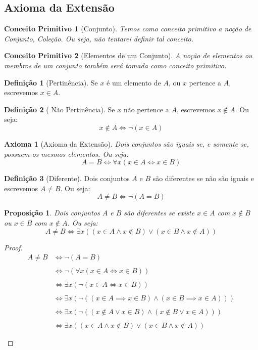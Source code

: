 \documentclass{article}
\theoremstyle{plain}
\newtheorem{axioma}{Axioma}
\newtheorem{conceitoPrimitivo}{Conceito Primitivo}
\newtheorem{prop}{Proposição}[section]
\theoremstyle{definition}
\newtheorem{definicao}{Definição}[section]
\theoremstyle{remark}
\begin{document}
\subsection{Axioma da Extensão}
\begin{conceitoPrimitivo}[Conjunto]
	Temos como conceito primitivo a noção de Conjunto, Coleção. Ou seja, não tentarei definir tal conceito.
\end{conceitoPrimitivo}
\begin{conceitoPrimitivo}[Elementos de um Conjunto]
	A noção de elementos ou membros de um conjunto também será tomada como conceito primitivo.
\end{conceitoPrimitivo}
\begin{definicao}[Pertinência]
	Se $x$ é um elemento de $A$, ou $x$ pertence a $A$, escrevemos $x\in A$.
\end{definicao}
\begin{definicao}[ Não Pertinência]
	Se $x$ não pertence a $A$, escrevemos $x \not \in A$. Ou seja:
	$$x \not \in A \iff \neg (x\in A)$$
\end{definicao}
\begin{axioma}[Axioma da Extensão]
	Dois conjuntos são iguais se, e somente se, possuem os mesmos elementos. Ou seja: 
	$$ A = B \iff \forall x ( x\in A \iff x \in B) $$
\end{axioma}
\begin{definicao}[Diferente]
	Dois conjuntos $A$ e $B$ são diferentes se não são iguais e escrevemos $A\neq B$. Ou seja:
	$$A\neq B \iff \neg (A = B)$$
\end{definicao}
\begin{prop}
	Dois conjuntos $A$ e $B$  são diferentes se existe $x\in A$ com $x\not \in B $ ou $x\in B$ com $x\not \in A$. Ou seja:
	$$A \neq B \iff \exists x ( ( x\in A \land x\not \in B) \lor (x\in B  \land x\not \in A))$$
\end{prop}
\begin{proof}
	\begin{align*}
		A\neq B &\iff \neg (A = B) \\~\\
		&\iff \neg (\forall x ( x\in A \iff x \in B)) \\~\\
		&\iff \exists x ( \neg ( x\in A \iff x \in B)) \\~\\
		&\iff \exists x ( \neg (( x\in A \implies x \in B) \land (x\in B \implies x\in A))) \\~\\
		&\iff \exists x ( \neg ((  x\not\in A \lor x\in B) \land ( x\not\in B \lor x\in A))) \\~\\
		&\iff \exists x ( (  x\in A \land x\not\in B) \lor ( x\in B \land x\not \in A)) \\~\\
	\end{align*}
\end{proof}
\end{document}
